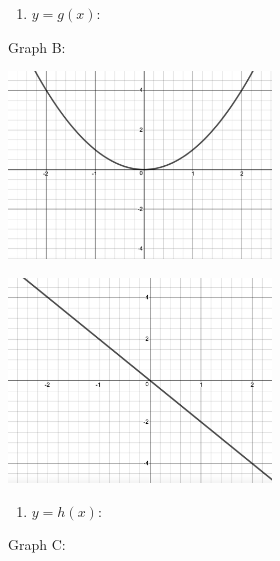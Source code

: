\begin{center}
\begin{multicols}{2}
\begin{enumerate}
\item $y = g(x)$:

\setcounter{HW}{\value{enumi}}
\end{enumerate}

Graph B:

\end{multicols}

\begin{multicols}{2}

\includegraphics[width=2.75in]{./IntroductiontoDerivativesGraphics/MatchFunc02.jpeg}

\includegraphics[width=2.75in]{./IntroductiontoDerivativesGraphics/MatchDeriv01.jpeg}

\end{multicols}


\begin{multicols}{2}

\begin{enumerate}
\setcounter{enumi}{\value{HW}}

\item \label{MatchFcnDerivative1last} $y = h(x)$:

\setcounter{HW}{\value{enumi}}
\end{enumerate}


Graph C:

\end{multicols}




\begin{multicols}{2}


\end{multicols}
\end{center}
